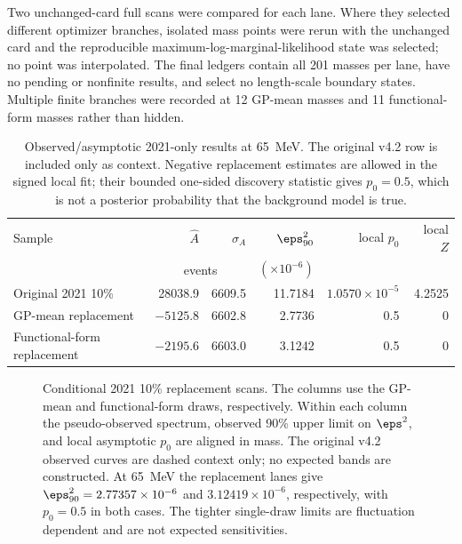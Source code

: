 Two unchanged-card full scans were compared for each lane.  Where they selected
different optimizer branches, isolated mass points were rerun with the
unchanged card and the reproducible maximum-log-marginal-likelihood state was
selected; no point was interpolated.  The final ledgers contain all 201 masses
per lane, have no pending or nonfinite results, and select no length-scale
boundary states.  Multiple finite branches were recorded at 12 GP-mean masses
and 11 functional-form masses rather than hidden.

\begin{table}[H]
\centering
\small
\caption{Observed/asymptotic 2021-only results at 65~MeV.  The original v4.2
row is included only as context.  Negative replacement estimates are allowed
in the signed local fit; their bounded one-sided discovery statistic gives
$p_0=0.5$, which is not a posterior probability that the background model is
true.}
\label{tab:v4p2-pseudo65-m065}
\begin{tabular}{lrrrrr}
\toprule
Sample & $\widehat A$ & $\sigma_A$ &
$\eps^2_{90}$ & local $p_0$ & local $Z$ \\
 & \multicolumn{2}{c}{events} & $(\times10^{-6})$ & & \\
\midrule
Original 2021 10\% & 28038.9 & 6609.5 & 11.7184 &
$1.0570\times10^{-5}$ & 4.2525 \\
GP-mean replacement & $-5125.8$ & 6602.8 & 2.7736 &
0.5 & 0 \\
Functional-form replacement & $-2195.6$ & 6603.0 & 3.1242 &
0.5 & 0 \\
\bottomrule
\end{tabular}
\end{table}

\begin{figure}[H]
\centering
{}
\caption{Conditional 2021 10\% replacement scans.  The columns use the
GP-mean and functional-form draws, respectively.  Within each column the
pseudo-observed spectrum, observed 90\% \CLs{} upper limit on $\eps^2$, and
local asymptotic $p_0$ are aligned in mass.  The original v4.2 observed curves
are dashed context only; no expected bands are constructed.  At 65~MeV the
replacement lanes give $\eps^2_{90}=2.77357\times10^{-6}$ and
$3.12419\times10^{-6}$, respectively, with $p_0=0.5$ in both cases.  The
tighter single-draw limits are fluctuation dependent and are not expected
sensitivities.}
\label{fig:appendix-v4p2-pseudo65-scans}
\end{figure}

